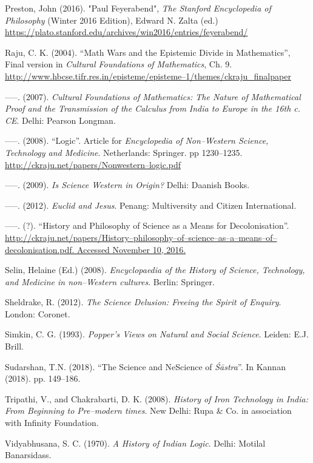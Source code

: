 \begin{thebibliography}{99}
  Preston, John (2016). "Paul Feyerabend", \textit{The Stanford Encyclopedia of Philosophy} (Winter 2016 Edition), Edward N. Zalta (ed.) \url{https://plato.stanford.edu/archives/win2016/entries/feyerabend/}
 
  Raju, C. K. (2004). “Math Wars and the Epistemic Divide in Mathematics”, Final version in \textit{Cultural Foundations of Mathematics}, Ch. 9. \url{http://www.hbcse.tifr.res.in/episteme/episteme–1/themes/ckraju_finalpaper}

  –––. (2007). \textit{Cultural Foundations of Mathematics: The Nature of Mathematical Proof and the Transmission of the Calculus from India to Europe in the 16th c. CE}. Delhi: Pearson Longman.

  –––. (2008). “Logic”. Article for \textit{Encyclopedia of Non–Western Science, Technology and Medicine}. Netherlands: Springer. pp 1230–1235. \url{http://ckraju.net/papers/Nonwestern–logic.pdf}

  –––. (2009). \textit{Is Science Western in Origin?} Delhi: Daanish Books.

  –––. (2012). \textit{Euclid and Jesus}. Penang: Multiversity and Citizen International.

  –––. (?). “History and Philosophy of Science as a Means for Decolonisation”. \url{http://ckraju.net/papers/History–philosophy–of–science–as–a–means–of–decolonisation.pdf. Accessed November 10, 2016.}

  Selin, Helaine (Ed.) (2008). \textit{Encyclopaedia of the History of Science, Technology, and Medicine in non–Western cultures}. Berlin: Springer.

  Sheldrake, R. (2012). \textit{The Science Delusion: Freeing the Spirit of Enquiry}. London: Coronet.

  Simkin, C. G. (1993). \textit{Popper's Views on Natural and Social Science}. Leiden: E.J. Brill.

  Sudarshan, T.N. (2018). “The Science and NeScience of \textit{Śāstra}”. In Kannan (2018). pp. 149–186.

  Tripathi, V., and Chakrabarti, D. K. (2008). \textit{History of Iron Technology in India: From Beginning to Pre–modern times}. New Delhi: Rupa \& Co. in association with Infinity Foundation.

  Vidyabhusana, S. C. (1970). \textit{A History of Indian Logic}. Delhi: Motilal Banarsidass.

 \end{thebibliography}

\theendnotes

